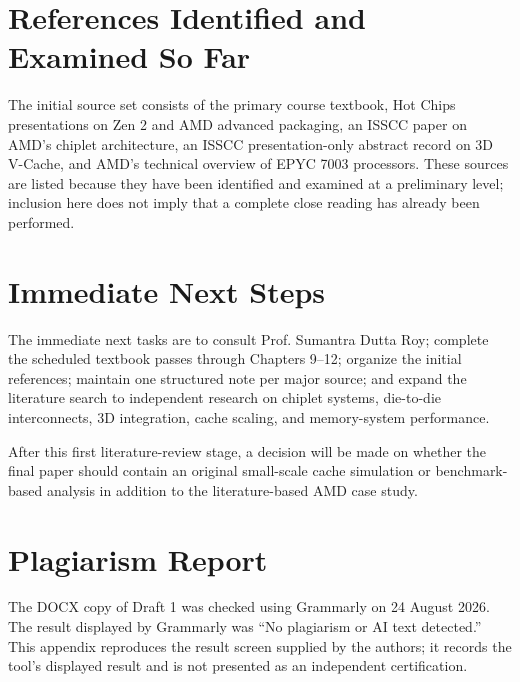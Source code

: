 \documentclass[12pt,a4paper,twoside]{article}
\begin{document}
\section{References Identified and Examined So Far}
\label{sec:sources}

The initial source set consists of the primary course textbook, Hot Chips presentations on Zen 2 and AMD advanced packaging, an ISSCC paper on AMD's chiplet architecture, an ISSCC presentation-only abstract record on 3D V-Cache, and AMD's technical overview of EPYC 7003 processors. These sources are listed because they have been identified and examined at a preliminary level; inclusion here does not imply that a complete close reading has already been performed.

\nocite{sarangi2025basic,suggs2019zen2,naffziger2020chiplet,wuu2022vcache,swaminathanAdvancedPackagingEnabling2021,amd2022epyc7003}
\printbibliography[heading=subbibliography,title={Initial bibliography}]

\section{Immediate Next Steps}
\label{sec:next-steps}

The immediate next tasks are to consult Prof. Sumantra Dutta Roy; complete the scheduled textbook passes through Chapters 9--12; organize the initial references; maintain one structured note per major source; and expand the literature search to independent research on chiplet systems, die-to-die interconnects, 3D integration, cache scaling, and memory-system performance.

After this first literature-review stage, a decision will be made on whether the final paper should contain an original small-scale cache simulation or benchmark-based analysis in addition to the literature-based AMD case study.

\clearpage
\appendix
\section{Plagiarism Report}
\label{app:plagiarism-report}

The DOCX copy of Draft 1 was checked using Grammarly on 24 August 2026. The result displayed by Grammarly was ``No plagiarism or AI text detected.'' This appendix reproduces the result screen supplied by the authors; it records the tool's displayed result and is not presented as an independent certification.
\end{document}
